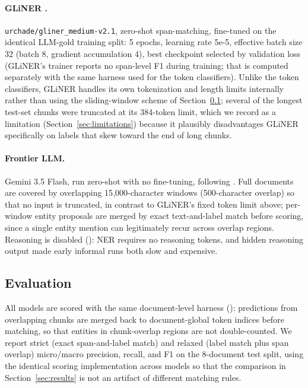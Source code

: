\documentclass[11pt]{article}
\begin{document}
\paragraph{GLiNER \citep{zaratiana2024gliner}.}
\texttt{urchade/gliner\_medium-v2.1}, zero-shot span-matching, fine-tuned on
the identical LLM-gold training split: 5 epochs, learning rate 5e-5,
effective batch size 32 (batch 8, gradient accumulation 4), best checkpoint
selected by validation loss (GLiNER's trainer reports no span-level F1
during training; that is computed separately with the same harness used for
the token classifiers). Unlike the token classifiers, GLiNER handles its own
tokenization and length limits internally rather than using the
sliding-window scheme of Section~\ref{sec:evaluation}; several of the
longest test-set chunks were truncated at its 384-token limit, which we
record as a limitation (Section~\ref{sec:limitations}) because it plausibly
disadvantages GLiNER specifically on labels that skew toward the end of long
chunks.

\paragraph{Frontier LLM.} Gemini 3.5 Flash, run zero-shot with no
fine-tuning, following \citet{alam2024ctibench}. Full documents are covered
by overlapping 15{,}000-character windows (500-character overlap) so that no
input is truncated, in contrast to GLiNER's fixed token limit above;
per-window entity proposals are merged by exact text-and-label match before
scoring, since a single entity mention can legitimately recur across overlap
regions. Reasoning is disabled (): NER requires
no reasoning tokens, and hidden reasoning output made early informal runs
both slow and expensive.

\subsection{Evaluation}
\label{sec:evaluation}

All models are scored with the same document-level harness
(): predictions from overlapping chunks are merged back
to document-global token indices before matching, so that entities in
chunk-overlap regions are not double-counted. We report strict (exact
span-and-label match) and relaxed (label match plus span overlap)
micro/macro precision, recall, and F1 on the 8-document test split, using
the identical scoring implementation across models so that the comparison in
Section~\ref{sec:results} is not an artifact of different matching rules.
\end{document}

